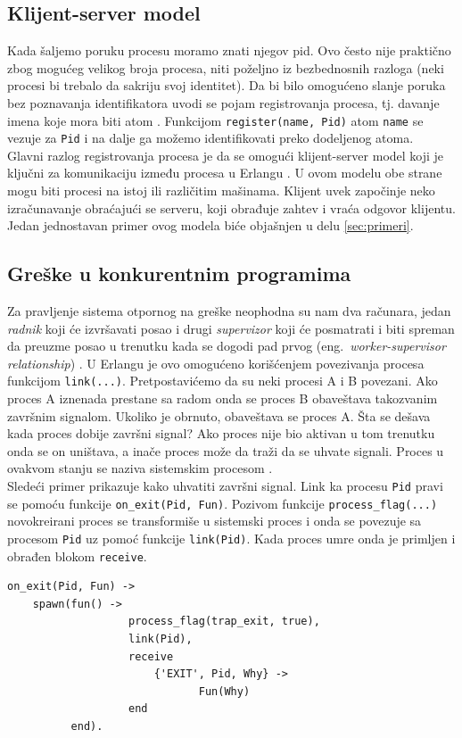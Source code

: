 \documentclass[a4paper]{article}
\begin{document}
\subsection{Klijent-server model}
\label{sec:ksmodel}
Kada šaljemo poruku procesu moramo znati njegov pid. 
Ovo često nije praktično zbog mogućeg velikog broja procesa, 
niti poželjno iz bezbednosnih razloga 
(neki procesi bi trebalo da sakriju svoj identitet). 
Da bi bilo omogućeno slanje poruka bez poznavanja identifikatora uvodi se pojam registrovanja procesa, 
tj. davanje imena koje mora biti atom \cite{book_joe, phdthesis}.
Funkcijom {\texttt{register(name, Pid)}} atom {\texttt{name}} se vezuje za {\texttt{Pid}} i na dalje ga možemo identifikovati preko dodeljenog atoma.\\

Glavni razlog registrovanja procesa je da se omogući klijent-server model koji je ključni za komunikaciju između procesa u Erlangu \cite{book_concurrent, book_joe, phdthesis}.
U ovom modelu obe strane mogu biti procesi na istoj ili različitim mašinama. 
Klijent uvek započinje neko izračunavanje obraćajući se serveru, 
koji obrađuje zahtev i vraća odgovor klijentu. Jedan jednostavan primer ovog modela biće objašnjen u delu \ref{sec:primeri}.

\subsection{Greške u konkurentnim programima}
Za pravljenje sistema otpornog na greške neophodna su nam dva računara, 
jedan {\em radnik} koji će izvršavati posao i drugi {\em supervizor} 
koji će posmatrati i biti spreman da preuzme posao u trenutku kada se dogodi pad prvog  (eng.~{\em worker-supervisor relationship}) \cite{book_joe}. 
U Erlangu je ovo omogućeno korišćenjem povezivanja procesa funkcijom {\texttt{link(...)}}.
Pretpostavićemo da su neki procesi A i B  povezani. 
Ako proces A iznenada prestane sa radom onda se proces B obaveštava takozvanim završnim signalom. 
Ukoliko je obrnuto, obaveštava se proces A. 
Šta se dešava kada proces dobije završni signal? 
Ako proces nije bio aktivan u tom trenutku onda se on uništava, 
a inače proces može da traži da se uhvate signali. Proces u ovakvom stanju se naziva sistemskim procesom \cite{book_joe}. \\

Sledeći primer prikazuje kako uhvatiti završni signal. 
Link ka procesu {\texttt{Pid}} pravi se pomoću funkcije
{\texttt{on_exit(Pid, Fun)}}. 
Pozivom funkcije {\texttt{process_flag(...)}} novokreirani proces se transformiše u sistemski proces 
i onda se povezuje sa procesom {\texttt{Pid}} uz pomoć funkcije {\texttt{link(Pid)}}. 
Kada proces umre onda je primljen i obrađen blokom {\texttt{receive}}.
\begin{verbatim} 
on_exit(Pid, Fun) ->	
    spawn(fun() ->    
                   process_flag(trap_exit, true),
                   link(Pid),
                   receive
                       {'EXIT', Pid, Why} ->
                              Fun(Why)
                   end
          end).
\end{verbatim}
\end{document}

